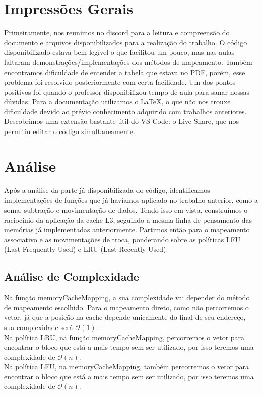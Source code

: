 \documentclass{article}
\begin{document}
\section{Impressões Gerais}
Primeiramente, nos reunimos no discord para a leitura e compreensão do documento e arquivos disponibilizados para a realização do trabalho.
O código disponibilizado estava bem legível o que facilitou um pouco, mas nas aulas faltaram demonstrações/implementações dos métodos de mapeamento. 
Também encontramos dificuldade de entender a tabela que estava no PDF, porém, esse problema foi resolvido posteriormente com certa facilidade. Um dos pontos positivos foi quando o professor disponibilizou tempo de aula para sanar nossas dúvidas.
Para a documentação utilizamos o \LaTeX, o que não nos trouxe dificuldade devido ao prévio conhecimento adquirido com trabalhos anteriores. 
Descobrimos uma extensão bastante útil do VS Code: o Live Share, que nos permitiu editar o código simultaneamente.
\clearpage
\section{Análise}

Após a análise da parte já disponibilizada do código, identificamos implementações de funções que já havíamos aplicado no trabalho anterior, como a soma, subtração e movimentação de dados.
Tendo isso em vista, construímos o raciocínio da aplicação da cache L3, seguindo a mesma linha de pensamento das memórias já implementadas anteriormente. 
Partimos então para o mapeamento associativo e as movimentações de troca, ponderando sobre as políticas LFU (Last Frequently Used) e LRU (Last Recently Used).

\subsection{Análise de Complexidade}
Na função memoryCacheMapping, a sua complexidade vai depender do método de mapeamento escolhido. Para o mapeamento direto, 
como não percorremos o vetor, já que a posição na cache depende unicamente do final de seu endereço, 
sua complexidade será $\mathcal{O}(1)$. \\

Na política LRU, na função memoryCacheMapping, percorremos o vetor para encontrar o bloco que está a mais tempo sem ser utilizado, por isso 
teremos uma complexidade de $\mathcal{O}(n)$. \\

Na política LFU, na memoryCacheMapping, também percorremos o vetor para encontrar o bloco que está a mais tempo sem ser utilizado, por isso 
teremos uma complexidade de $\mathcal{O}(n)$.
\clearpage
\end{document}
